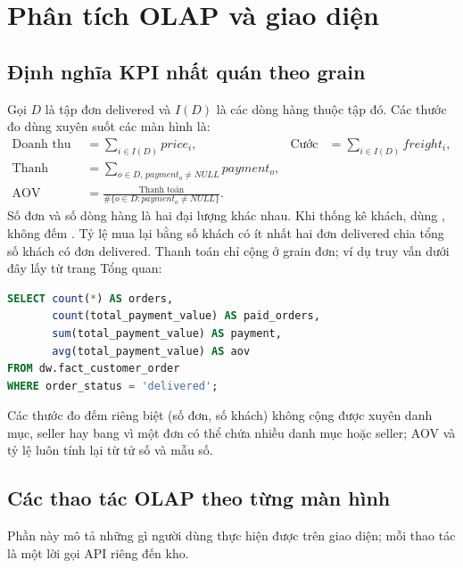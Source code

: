 \section{Phân tích OLAP và giao diện}\label{sec:olap}
\subsection{Định nghĩa KPI nhất quán theo grain}
Gọi $D$ là tập đơn delivered và $I(D)$ là các dòng hàng thuộc tập đó. Các thước đo dùng xuyên suốt các màn hình là:
\begin{align}
\text{Doanh thu hàng} &= \sum_{i\in I(D)} price_i, &
\text{Cước} &= \sum_{i\in I(D)} freight_i,\\
\text{Thanh toán} &= \sum_{o\in D,\,payment_o\ne NULL} payment_o,\\
\mathrm{AOV} &= \frac{\text{Thanh toán}}{\#\{o\in D: payment_o\ne NULL\}}.
\end{align}
Số đơn và số dòng hàng là hai đại lượng khác nhau. Khi thống kê khách, dùng , không đếm . Tỷ lệ mua lại bằng số khách có ít nhất hai đơn delivered chia tổng số khách có đơn delivered. Thanh toán chỉ cộng ở grain đơn; ví dụ truy vấn dưới đây lấy từ trang Tổng quan:
\begin{lstlisting}[language=SQL]
SELECT count(*) AS orders,
       count(total_payment_value) AS paid_orders,
       sum(total_payment_value) AS payment,
       avg(total_payment_value) AS aov
FROM dw.fact_customer_order
WHERE order_status = 'delivered';
\end{lstlisting}
Các thước đo đếm riêng biệt (số đơn, số khách) không cộng được xuyên danh mục, seller hay bang vì một đơn có thể chứa nhiều danh mục hoặc seller; AOV và tỷ lệ luôn tính lại từ tử số và mẫu số.

\subsection{Các thao tác OLAP theo từng màn hình}
Phần này mô tả những gì người dùng thực hiện được trên giao diện; mỗi thao tác là một lời gọi API riêng đến kho.

